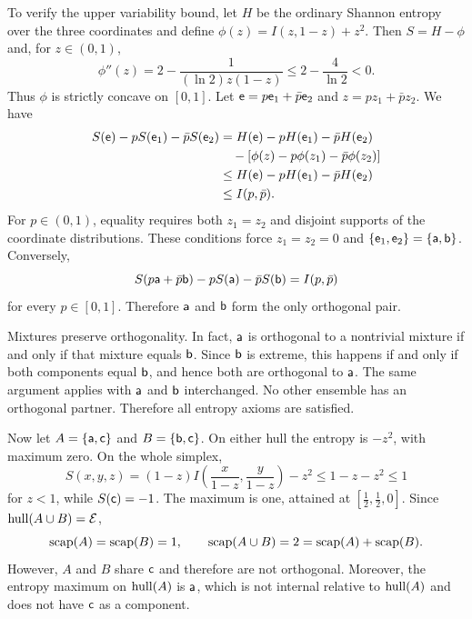 To verify the upper variability bound, let $H$ be the ordinary Shannon entropy over the three coordinates and define $\phi(z)=I(z,1-z)+z^2$. Then $S=H-\phi$ and, for $z\in(0,1)$,
\begin{equation}
	\phi''(z)
	=2-\frac{1}{(\ln2)z(1-z)}
	\leq 2-\frac{4}{\ln2}<0.
\end{equation}
Thus $\phi$ is strictly concave on $[0,1]$. Let $\ens=p\ens_1+\bar{p}\ens_2$ and $z=pz_1+\bar{p}z_2$. We have
\begin{equation}
	\begin{aligned}
		S(\ens)-pS(\ens_1)-\bar{p}S(\ens_2)
		&= H(\ens)-pH(\ens_1)-\bar{p}H(\ens_2) \\
		&\quad-\left[\phi(z)-p\phi(z_1)-\bar{p}\phi(z_2)\right] \\
		&\leq H(\ens)-pH(\ens_1)-\bar{p}H(\ens_2) \\
		&\leq I(p,\bar{p}).
	\end{aligned}
\end{equation}
For $p\in(0,1)$, equality requires both $z_1=z_2$ and disjoint supports of the coordinate distributions. These conditions force $z_1=z_2=0$ and $\{\ens_1,\ens_2\}=\{\ens[a],\ens[b]\}$. Conversely,
\begin{equation}
	S(p\ens[a]+\bar{p}\ens[b])
	-pS(\ens[a])-\bar{p}S(\ens[b])
	=I(p,\bar{p})
\end{equation}
for every $p\in[0,1]$. Therefore $\ens[a]$ and $\ens[b]$ form the only orthogonal pair.

Mixtures preserve orthogonality. In fact, $\ens[a]$ is orthogonal to a nontrivial mixture if and only if that mixture equals $\ens[b]$. Since $\ens[b]$ is extreme, this happens if and only if both components equal $\ens[b]$, and hence both are orthogonal to $\ens[a]$. The same argument applies with $\ens[a]$ and $\ens[b]$ interchanged. No other ensemble has an orthogonal partner. Therefore all entropy axioms are satisfied.

Now let $A=\{\ens[a],\ens[c]\}$ and $B=\{\ens[b],\ens[c]\}$. On either hull the entropy is $-z^2$, with maximum zero. On the whole simplex,
\begin{equation}
	S(x,y,z)
	=(1-z)I\left(\frac{x}{1-z},\frac{y}{1-z}\right)-z^2
	\leq 1-z-z^2 \leq 1
\end{equation}
for $z<1$, while $S(\ens[c])=-1$. The maximum is one, attained at $[\frac12,\frac12,0]$. Since $\hull(A\cup B)=\Ens$,
\begin{equation}
	\scap(A)=\scap(B)=1, \qquad
	\scap(A\cup B)=2=\scap(A)+\scap(B).
\end{equation}
However, $A$ and $B$ share $\ens[c]$ and therefore are not orthogonal. Moreover, the entropy maximum on $\hull(A)$ is $\ens[a]$, which is not internal relative to $\hull(A)$ and does not have $\ens[c]$ as a component.

